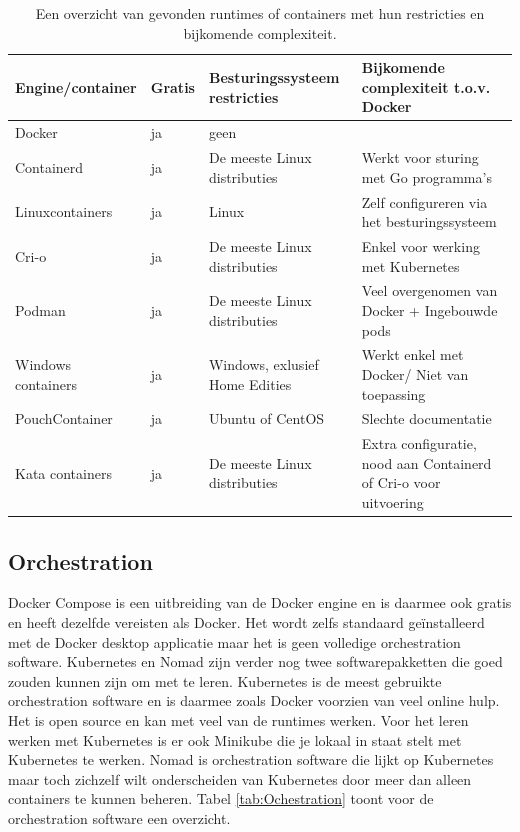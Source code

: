 \begin{center}
    \begin{table}
    \begin{tabular}{ m{3.5cm} || m{1cm} | m{3.3cm} | m{4.5cm} }
        Engine/container & Gratis & Besturingssysteem restricties & Bijkomende complexiteit t.o.v. Docker \\ 
        \hline
        Docker & ja & geen &  \\  
        \hline
        Containerd & ja & De meeste Linux distributies & Werkt voor sturing met Go programma’s \\
        \hline 
        Linuxcontainers & ja & Linux & Zelf configureren via het besturingssysteem \\
        \hline
        Cri-o & ja & De meeste Linux distributies & Enkel voor werking met Kubernetes \\
        \hline
        Podman & ja & De meeste Linux distributies & Veel overgenomen van Docker + Ingebouwde pods \\
        \hline
        Windows containers & ja & Windows, exlusief Home Edities & Werkt enkel met Docker/ Niet van toepassing \\
        \hline
        PouchContainer & ja & Ubuntu of CentOS & Slechte documentatie \\
        \hline
        Kata containers & ja & De meeste Linux distributies & Extra configuratie, nood aan Containerd of Cri-o voor uitvoering \\
    \end{tabular}
    \caption[Overzicht Runtimes en containers]{Een overzicht van gevonden runtimes of containers met hun restricties en bijkomende complexiteit.}
    \label{tab:Engines}
    \end{table}
\end{center}

\subsection{Orchestration}
Docker Compose is een uitbreiding van de Docker engine en is daarmee ook gratis en heeft dezelfde vereisten als Docker. Het wordt zelfs standaard geïnstalleerd met de Docker desktop applicatie maar het is geen volledige orchestration software. Kubernetes en Nomad zijn verder nog twee softwarepakketten die goed zouden kunnen zijn om met te leren. Kubernetes is de meest gebruikte orchestration software en is daarmee zoals Docker voorzien van veel online hulp. Het is open source en kan met veel van de runtimes werken. Voor het leren werken met Kubernetes is er ook Minikube die je lokaal in staat stelt met Kubernetes te werken. Nomad is orchestration software die lijkt op Kubernetes maar toch zichzelf wilt onderscheiden van Kubernetes door meer dan alleen containers te kunnen beheren. Tabel \ref{tab:Ochestration} toont voor de orchestration software een overzicht.

